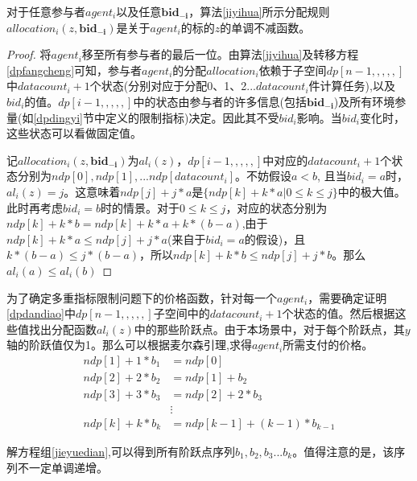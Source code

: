 \documentclass[promaster]{thesis-uestc}
\begin{document}
\begin{theorem}
对于任意参与者$agent_i$以及任意$\mathbf{bid_{-i}}$，算法\ref{jiyihua}所示分配规则$allocation_i(z,\mathbf{bid_{-i}})$是关于$agent_i$的标的$z$的单调不减函数。
\end{theorem}
\begin{proof}
\label{dpdandiao}
将$agent_i$移至所有参与者的最后一位。由算法\ref{jiyihua}及转移方程\ref{dpfangcheng}可知，参与者$agent_i$的分配$allocation_i$依赖于子空间$dp[n-1,,,,,]$中$datacount_i+1$个状态(分别对应于分配0、1、2...$datacount_i$件计算任务),以及$bid_i$的值。$dp[i-1,,,,,]$中的状态由参与者的许多信息(包括$\mathbf{bid_{-i}}$)及所有环境参量(如\ref{dpdingyi}节中定义的限制指标)决定。因此其不受$bid_i$影响。当$bid_i$变化时，这些状态可以看做固定值。

记$allocation_i(z,\mathbf{bid_{-i}})$为$al_i(z)$，$dp[i-1,,,,,]$中对应的$datacount_i+1$个状态分别为$ndp[0],ndp[1],...ndp[datacount_i]$。不妨假设$a < b$, 且当$bid_i = a$时，$al_i(z) = j$。这意味着$ndp[j]+j*a$是$\{ndp[k] + k*a|0 \leq k \leq j\}$中的极大值。此时再考虑$bid_i=b$时的情景。对于$ 0\leq k\leq j$，对应的状态分别为$ndp[k]+k*b=ndp[k]+k*a+k*(b-a)$,由于$ndp[k]+k*a\leq ndp[j]+j*a$(来自于$bid_i=a$的假设)，且$k*(b-a)\leq j*(b-a)$，所以$ndp[k]+k*b \leq ndp[j]+j*b$。那么$al_i(a)\leq al_i(b)$
\end{proof}

为了确定多重指标限制问题下的价格函数，针对每一个$agent_i$，需要确定证明\ref{dpdandiao}中$dp[n-1,,,,,]$子空间中的$datacount_i+1$个状态的值。然后根据这些值找出分配函数$al_i(z)$中的那些阶跃点。由于本场景中，对于每个阶跃点，其$y$轴的阶跃值仅为1。那么可以根据麦尔森引理,求得$agent_i$所需支付的价格。
\begin{equation}
\label{jieyuedian}
 \begin{aligned}
 ndp[1]+1*b_1&=ndp[0]\\
 ndp[2]+2*b_2&=ndp[1]+b_2\\
 ndp[3]+3*b_3&=ndp[2]+2*b_3\\
 &\vdots\\
 ndp[k]+k*b_k&=ndp[k-1]+(k-1)*b_{k-1}
 \end{aligned}
\end{equation}

解方程组\ref{jieyuedian},可以得到所有阶跃点序列$b_1,b_2,b_3...b_k$。值得注意的是，该序列不一定单调递增。

\setcounter{footnote}{0}
\end{document}
